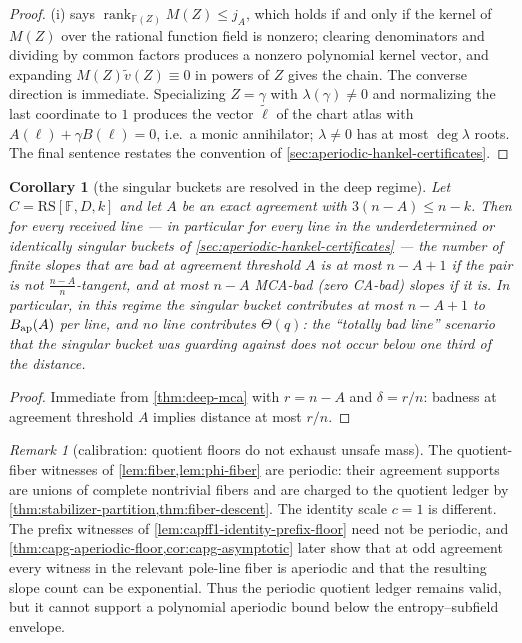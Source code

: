 \documentclass[11pt]{article}
\newtheorem{corollary}[corollary]{Corollary}
\theoremstyle{definition}
\theoremstyle{remark}
\newtheorem{remark}[remark]{Remark}
\newcommand{\F}{\mathbb{F}}
\newcommand{\RS}{\mathrm{RS}}
\begin{document}
\begin{proof}
(i) says $\operatorname{rank}_{\F(Z)}M(Z)\le j_A$, which holds if and only if the kernel of $M(Z)$ over the rational function field is nonzero; clearing denominators and dividing by common factors produces a nonzero polynomial kernel vector, and expanding $M(Z)\widetilde v(Z)\equiv0$ in powers of $Z$ gives the chain. The converse direction is immediate. Specializing $Z=\gamma$ with $\lambda(\gamma)\ne0$ and normalizing the last coordinate to $1$ produces the vector $\widetilde\ell$ of the chart atlas with $A(\ell)+\gamma B(\ell)=0$, i.e.\ a monic annihilator; $\lambda\ne0$ has at most $\deg\lambda$ roots. The final sentence restates the convention of \cref{sec:aperiodic-hankel-certificates}.
\end{proof}

\begin{corollary}[the singular buckets are resolved in the deep regime]\label{cor:singular-deep}
Let $C=\RS[\F,D,k]$ and let $A$ be an exact agreement with $3(n-A)\le n-k$. Then for every received line --- in particular for every line in the underdetermined or identically singular buckets of \cref{sec:aperiodic-hankel-certificates} --- the number of finite slopes that are bad at agreement threshold $A$ is at most $n-A+1$ if the pair is not $\frac{n-A}n$-tangent, and at most $n-A$ MCA-bad \textup(zero CA-bad\textup) slopes if it is. In particular, in this regime the singular bucket contributes at most $n-A+1$ to $B_{\rm ap}(A)$ per line, and no line contributes $\Theta(q)$: the ``totally bad line'' scenario that the singular bucket was guarding against does not occur below one third of the distance.
\end{corollary}

\begin{proof}
Immediate from \cref{thm:deep-mca} with $r=n-A$ and $\delta=r/n$: badness at agreement threshold $A$ implies distance at most $r/n$.
\end{proof}

\begin{remark}[calibration: quotient floors do not exhaust unsafe mass]\label{rem:quotient-borne}
The quotient-fiber witnesses of \cref{lem:fiber,lem:phi-fiber} are periodic: their agreement supports are unions of complete nontrivial fibers and are charged to the quotient ledger by \cref{thm:stabilizer-partition,thm:fiber-descent}.  The identity scale $c=1$ is different.  The prefix witnesses of \cref{lem:capff1-identity-prefix-floor} need not be periodic, and \cref{thm:capg-aperiodic-floor,cor:capg-asymptotic} later show that at odd agreement every witness in the relevant pole-line fiber is aperiodic and that the resulting slope count can be exponential.  Thus the periodic quotient ledger remains valid, but it cannot support a polynomial aperiodic bound below the entropy--subfield envelope.
\end{remark}
\end{document}
